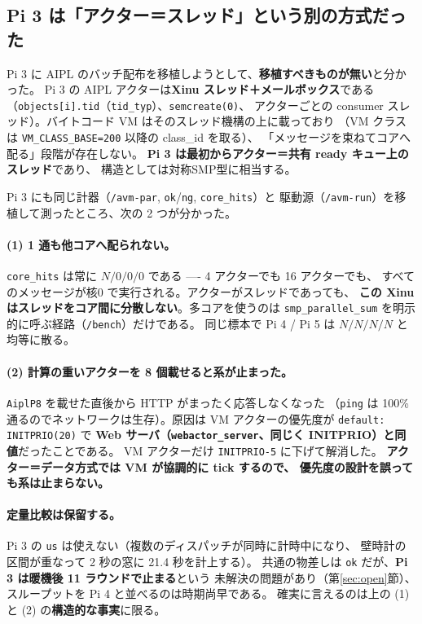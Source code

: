 \documentclass[a4paper,11pt]{ltjsarticle}
\begin{document}
\subsection{Pi 3 は「アクター＝スレッド」という別の方式だった}
Pi 3 に AIPL のバッチ配布を移植しようとして、\textbf{移植すべきものが無い}と分かった。
Pi 3 の AIPL アクターは\textbf{Xinu スレッド＋メールボックス}である
（\texttt{objects[i].tid}（\texttt{tid\_typ}）、\texttt{semcreate(0)}、
アクターごとの consumer スレッド）。バイトコード VM はそのスレッド機構の上に載っており
（VM クラスは \texttt{VM\_CLASS\_BASE=200} 以降の class\_id を取る）、
「メッセージを束ねてコアへ配る」段階が存在しない。
\textbf{Pi 3 は最初からアクター＝共有 ready キュー上のスレッド}であり、
構造としては対称SMP型に相当する。

Pi 3 にも同じ計器（\texttt{/avm-par}, \texttt{ok}/\texttt{ng}, \texttt{core\_hits}）と
駆動源（\texttt{/avm-run}）を移植して測ったところ、次の 2 つが分かった。

\paragraph{(1) 1 通も他コアへ配られない。}
\texttt{core\_hits} は常に $N/0/0/0$ である ---- 4 アクターでも 16 アクターでも、
すべてのメッセージが核0 で実行される。アクターがスレッドであっても、
\textbf{この Xinu はスレッドをコア間に分散しない}。多コアを使うのは
\texttt{smp\_parallel\_sum} を明示的に呼ぶ経路（\texttt{/bench}）だけである。
同じ標本で Pi 4 / Pi 5 は $N/N/N/N$ と均等に散る。

\paragraph{(2) 計算の重いアクターを 8 個載せると系が止まった。}
\texttt{AiplP8} を載せた直後から HTTP がまったく応答しなくなった
（\texttt{ping} は 100\% 通るのでネットワークは生存）。原因は
VM アクターの優先度が \texttt{default: INITPRIO(20)} で
\textbf{Web サーバ（\texttt{webactor\_server}、同じく INITPRIO）と同値}だったことである。
VM アクターだけ \texttt{INITPRIO-5} に下げて解消した。
\textbf{アクター＝データ方式では VM が協調的に tick するので、
優先度の設計を誤っても系は止まらない。}

\paragraph{定量比較は保留する。}
Pi 3 の \texttt{us} は使えない（複数のディスパッチが同時に計時中になり、
壁時計の区間が重なって 2 秒の窓に 21.4 秒を計上する）。
共通の物差しは \texttt{ok} だが、\textbf{Pi 3 は暖機後 11 ラウンドで止まる}という
未解決の問題があり（第\ref{sec:open}節）、スループットを Pi 4 と並べるのは時期尚早である。
確実に言えるのは上の (1) と (2) の\textbf{構造的な事実}に限る。
\end{document}
